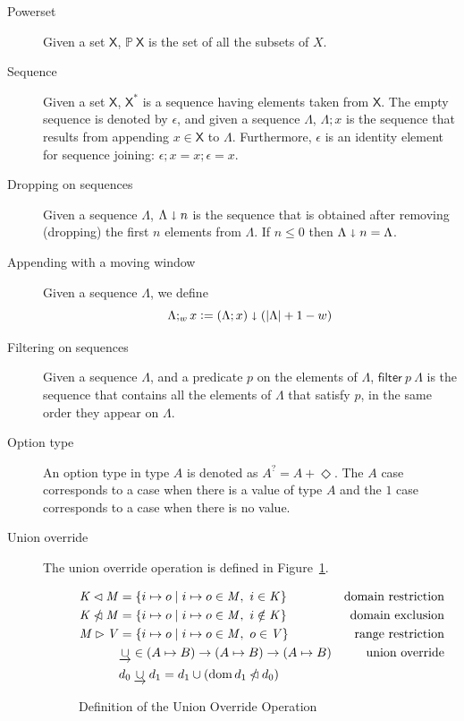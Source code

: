 \documentclass[11pt,a4paper]{article}
\DeclareMathOperator{\dom}{dom}
\newcommand{\powerset}[1]{\mathbb{P}~#1}
\newcommand{\restrictdom}{\lhd}
\newcommand{\subtractdom}{\mathbin{\slashed{\restrictdom}}}
\newcommand{\restrictrange}{\rhd}
\newcommand{\unionoverride}{\mathbin{\underrightarrow\cup}}
\newcommand{\var}[1]{\mathit{#1}}
\newcommand{\fun}[1]{\mathsf{#1}}
\newcommand{\type}[1]{\mathsf{#1}}
\newcommand{\size}[1]{\left| #1 \right|}
\newcommand{\seqof}[1]{#1^{*}}
\newcommand{\leteq}{\ensuremath{\mathrel{\mathop:}=}}
\newcommand{\Nothing}{\Diamond}
\begin{document}
\begin{description}
\item[Powerset] Given a set $\type{X}$, $\powerset{\type{X}}$ is the set of all
  the subsets of $X$.
\item[Sequence] Given a set $\type{X}$, $\seqof{\type{X}}$ is a sequence
  having elements taken from $\type{X}$.
  The empty sequence is denoted by $\epsilon$, and given a sequence $\Lambda$,
  $\Lambda; x$ is the sequence that results from appending
  $x \in \type{X}$ to $\Lambda$.
  Furthermore, $\epsilon$ is an identity element for sequence joining:
  $\epsilon; x = x; \epsilon = x$.
\item[Dropping on sequences] Given a sequence $\Lambda$,
  $\Lambda \shortdownarrow n$ is the sequence that is obtained after removing
  (dropping) the first $n$ elements from $\Lambda$. If $n \leq 0$ then
  $\Lambda \shortdownarrow n = \Lambda$.
\item[Appending with a moving window] Given a sequence $\Lambda$, we define
  $$\Lambda ;_w x \leteq (\Lambda; x) \shortdownarrow (\size{\Lambda} + 1 - w)$$
\item[Filtering on sequences] Given a sequence $\Lambda$, and a predicate $p$
  on the elements of $\Lambda$, $\fun{filter}~p~\Lambda$ is the sequence that
  contains all the elements of $\Lambda$ that satisfy $p$, in the same order
  they appear on $\Lambda$.
\item[Option type] An option type in type $A$ is denoted as $A^? = A + \Nothing$. The
  $A$ case corresponds to a case when there is a value of type $A$ and the $1$
  case corresponds to a case when there is no value.
\item[Union override] The union override operation is defined in
  Figure~\ref{fig:unionoverride}.
  \begin{figure}
    \begin{align*}
      \var{K} \restrictdom \var{M}
      & = \{ i \mapsto o \mid i \mapsto o \in \var{M}, ~ i \in \var{K} \}
      & \text{domain restriction}
      \\
      \var{K} \subtractdom \var{M}
      & = \{ i \mapsto o \mid i \mapsto o \in \var{M}, ~ i \notin \var{K} \}
      & \text{domain exclusion}
      \\
      \var{M} \restrictrange \var{V}
      & = \{ i \mapsto o \mid i \mapsto o \in \var{M}, ~ o \in \var{V} \}
      & \text{range restriction}
      \\
      & \unionoverride \in (A \mapsto B) \to (A \mapsto B) \to (A \mapsto B)
      & \text{union override}\\
      & d_0 \unionoverride d_1 = d_1 \cup (\dom d_1 \subtractdom d_0)
    \end{align*}
    \caption{Definition of the Union Override Operation}
    \label{fig:unionoverride}
  \end{figure}
\end{description}
\end{document}
